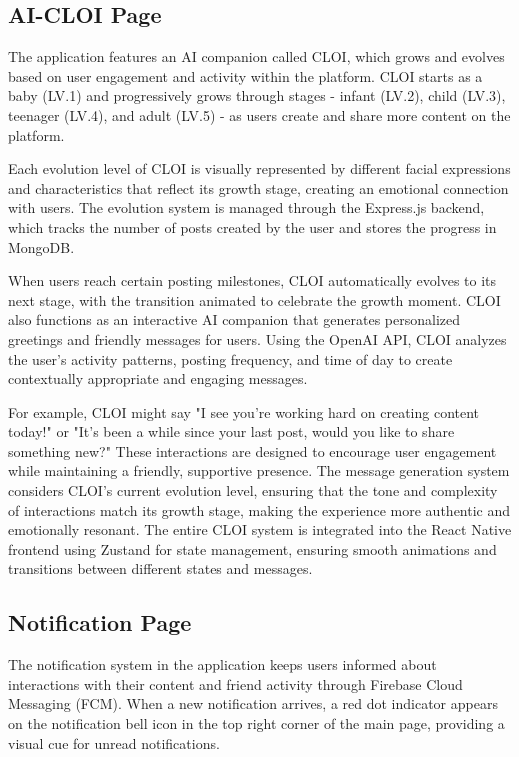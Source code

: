 \documentclass[conference]{IEEEtran}
\begin{document}
    \subsection{AI-CLOI Page}
        The application features an AI companion called CLOI, which grows and evolves based on user engagement and activity within the platform. CLOI starts as a baby (LV.1) and progressively grows through stages - infant (LV.2), child (LV.3), teenager (LV.4), and adult (LV.5) - as users create and share more content on the platform.

        Each evolution level of CLOI is visually represented by different facial expressions and characteristics that reflect its growth stage, creating an emotional connection with users. The evolution system is managed through the Express.js backend, which tracks the number of posts created by the user and stores the progress in MongoDB.

        When users reach certain posting milestones, CLOI automatically evolves to its next stage, with the transition animated to celebrate the growth moment. CLOI also functions as an interactive AI companion that generates personalized greetings and friendly messages for users. Using the OpenAI API, CLOI analyzes the user's activity patterns, posting frequency, and time of day to create contextually appropriate and engaging messages.

        For example, CLOI might say "I see you're working hard on creating content today!" or "It's been a while since your last post, would you like to share something new?" These interactions are designed to encourage user engagement while maintaining a friendly, supportive presence. The message generation system considers CLOI's current evolution level, ensuring that the tone and complexity of interactions match its growth stage, making the experience more authentic and emotionally resonant. The entire CLOI system is integrated into the React Native frontend using Zustand for state management, ensuring smooth animations and transitions between different states and messages.

    \subsection{Notification Page}
        The notification system in the application keeps users informed about interactions with their content and friend activity through Firebase Cloud Messaging (FCM). When a new notification arrives, a red dot indicator appears on the notification bell icon in the top right corner of the main page, providing a visual cue for unread notifications.
\end{document}
